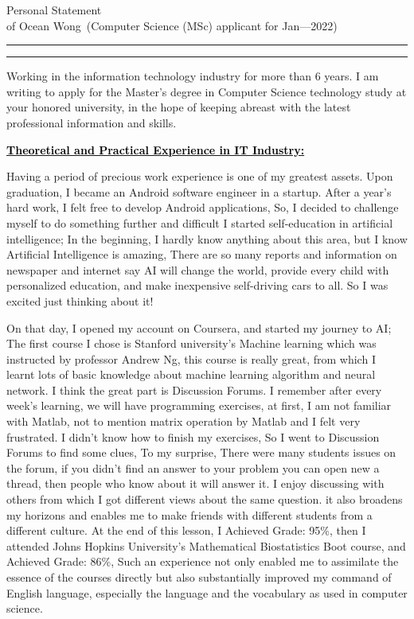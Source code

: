 \documentclass[12pt]{article}
\newcommand{\soptitle}{Personal Statement}
\newcommand{\yourname}{Ocean Wong}
\newcommand{\statement}[1]{\par\medskip
  \underline{\textcolor{black}{\textbf{#1:}}}\space
}
\begin{document}
\begin{center}\LARGE\soptitle\\
\large of \yourname\ (Computer Science (MSc) applicant for Jan---2022)
\end{center}

\hrule
\vspace{1pt}
\hrule height 1pt


\sffamily
\mdseries



\bigskip

Working in the information technology industry for more than 6 years. I am writing to apply for the Master's degree in Computer Science technology study at your honored university, in the hope of keeping abreast with the latest professional information and skills.

\bigskip

\statement{Theoretical and Practical Experience in IT Industry}
Having a period of precious work experience is one of my greatest assets. Upon graduation, I became an Android software engineer in a startup. After a year's hard work, I felt free to develop Android applications, So, I decided to challenge myself to do something further and difficult
I started self-education in artificial intelligence; In the beginning, I hardly know anything about this area, but I know Artificial Intelligence is amazing, There are so many reports and information on newspaper and internet say AI will change the world, provide every child with personalized education, and make inexpensive self-driving cars to all. So I was excited just thinking about it! 

\bigskip

On that day, I opened my account on Coursera, and started my journey to AI; The first course I chose is Stanford university's Machine learning which was instructed by professor Andrew Ng, this course is really great, from which I learnt lots of basic knowledge about machine learning algorithm and neural network. I think the great part is Discussion Forums. I remember after every week's learning, we will have programming exercises, at first, I am not familiar with Matlab, not to mention matrix operation by Matlab and I felt very frustrated. I didn't know how to finish my exercises, So I went to Discussion Forums to find some clues, To my surprise, There were many students issues on the forum, if you didn't find an answer to your problem you can open new a thread, then people who know about it will answer it. I enjoy discussing with others from which I got different views about the same question. it also broadens my horizons and enables me to make friends with different students from a different culture. At the end of this lesson, I Achieved Grade: 95\%, then I attended Johns Hopkins University's Mathematical Biostatistics Boot course, and Achieved Grade: 86\%, Such an experience not only enabled me to assimilate the essence of the courses directly but also substantially improved my command of English language, especially the language and the vocabulary as used in computer science.
\end{document}

